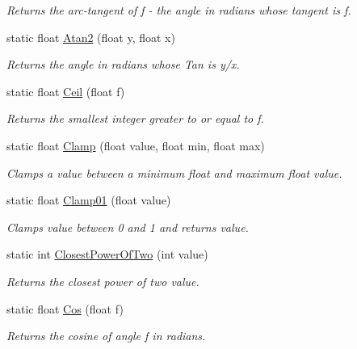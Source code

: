 \begin{DoxyCompactItemize}
\begin{DoxyCompactList}\small\item\em Returns the arc-\/tangent of f -\/ the angle in radians whose tangent is f. \end{DoxyCompactList}\item 
static float \mbox{\hyperlink{class_lua_1_1_mathf_ab7f3034dcb7244d1cfb06ae17f014278}{Atan2}} (float y, float x)
\begin{DoxyCompactList}\small\item\em Returns the angle in radians whose Tan is y/x. \end{DoxyCompactList}\item 
static float \mbox{\hyperlink{class_lua_1_1_mathf_aa17eeb105797860b39d5765c5f4a8929}{Ceil}} (float f)
\begin{DoxyCompactList}\small\item\em Returns the smallest integer greater to or equal to f. \end{DoxyCompactList}\item 
static float \mbox{\hyperlink{class_lua_1_1_mathf_ad734e258b7adf07ed4a34557d80f0122}{Clamp}} (float value, float min, float max)
\begin{DoxyCompactList}\small\item\em Clamps a value between a minimum float and maximum float value. \end{DoxyCompactList}\item 
static float \mbox{\hyperlink{class_lua_1_1_mathf_a8302fdbff60f945480e559d3f97474d5}{Clamp01}} (float value)
\begin{DoxyCompactList}\small\item\em Clamps value between 0 and 1 and returns value. \end{DoxyCompactList}\item 
static int \mbox{\hyperlink{class_lua_1_1_mathf_ae78395f9919d38bd29ae567f6f1aac3e}{Closest\+Power\+Of\+Two}} (int value)
\begin{DoxyCompactList}\small\item\em Returns the closest power of two value. \end{DoxyCompactList}\item 
static float \mbox{\hyperlink{class_lua_1_1_mathf_a9bb7f6cc54371f64edaf224c4a5365b6}{Cos}} (float f)
\begin{DoxyCompactList}\small\item\em Returns the cosine of angle f in radians. \end{DoxyCompactList}\item 

\end{DoxyCompactItemize}
